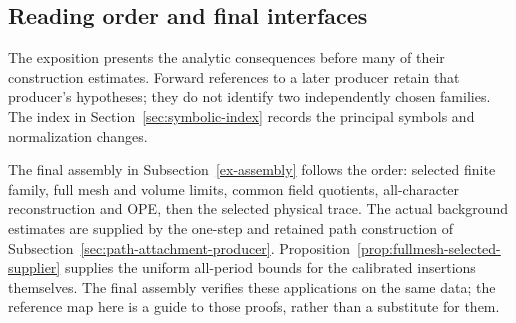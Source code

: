 \subsection{Reading order and final interfaces}
\label{ex-outline-map}
\label{ex-outline-open}

The exposition presents the analytic consequences before many of their
construction estimates. Forward references to a later producer retain
that producer's hypotheses; they do not identify two independently
chosen families. The index in Section~\ref{sec:symbolic-index} records
the principal symbols and normalization changes.

The final assembly in Subsection~\ref{ex-assembly} follows the order:
selected finite family, full mesh and volume limits, common field
quotients, all-character reconstruction and OPE, then the selected physical
trace. The actual background estimates are supplied by the one-step and
retained path construction of Subsection~\ref{sec:path-attachment-producer}.
Proposition~\ref{prop:fullmesh-selected-supplier} supplies the uniform
all-period bounds for the calibrated insertions themselves. The final
assembly verifies these applications on the same data; the reference map
here is a guide to those proofs, rather than a substitute for them.
